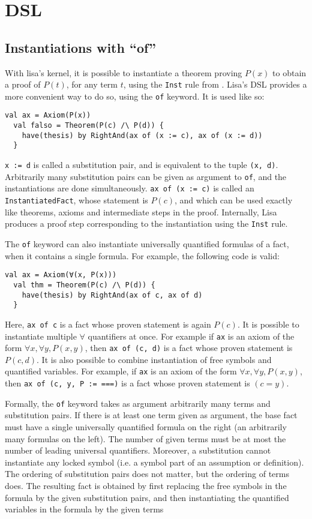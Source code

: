 \section{DSL}

\subsection{Instantiations with ``of''}

With lisa's kernel, it is possible to instantiate a theorem proving $P(x)$ to obtain a proof of $P(t)$, for any term $t$, using the \texttt{Inst} rule from . Lisa's DSL provides a more convenient way to do so, using the \lstinline|of| keyword. It is used like so:
\begin{lstlisting}[language=lisa, frame=single]
  val ax = Axiom(P(x))
  val falso = Theorem(P(c) /\ P(d)) {
    have(thesis) by RightAnd(ax of (x := c), ax of (x := d))
  }
\end{lstlisting}
\lstinline|x := d| is called a substitution pair, and is equivalent to the tuple \lstinline|(x, d)|. Arbitrarily many substitution pairs can be given as argument to \lstinline|of|, and the instantiations are done simultaneously. \lstinline|ax of (x := c)| is called an \lstinline|InstantiatedFact|, whose statement is $P(c)$, and which can be used exactly like theorems, axioms and intermediate steps in the proof. Internally, Lisa produces a proof step corresponding to the instantiation using the \texttt{Inst} rule.

The \lstinline|of| keyword can also instantiate universally quantified formulas of a fact, when it contains a single formula. For example, the following code is valid:
\begin{lstlisting}[language=lisa, frame=single]
  val ax = Axiom(∀(x, P(x)))
  val thm = Theorem(P(c) /\ P(d)) {
    have(thesis) by RightAnd(ax of c, ax of d)
  }
\end{lstlisting}
Here, \lstinline|ax of c| is a fact whose proven statement is again $P(c)$. It is possible to instantiate multiple $\forall$ quantifiers at once. For example if \lstinline|ax| is an axiom of the form $∀ x, ∀ y, P(x, y)$, then \lstinline|ax of (c, d)| is a fact whose proven statement is $P(c, d)$. It is also possible to combine instantiation of free symbols and quantified variables. For example, if \lstinline|ax| is an axiom of the form $∀ x, ∀ y, P(x, y)$, then \lstinline|ax of (c, y, P := ===)| is a fact whose proven statement is $(c = y)$.

Formally, the \lstinline|of| keyword takes as argument arbitrarily many terms and substitution pairs. If there is at least one term given as argument, the base fact must have a single universally quantified formula on the right (an arbitrarily many formulas on the left). The number of given terms must be at most the number of leading universal quantifiers. Moreover, a substitution cannot instantiate any locked symbol (i.e. a symbol part of an assumption or definition). The ordering of substitution pairs does not matter, but the ordering of terms does. The resulting fact is obtained by first replacing the free symbols in the formula by the given substitution pairs, and then instantiating the quantified variables in the formula by the given terms

